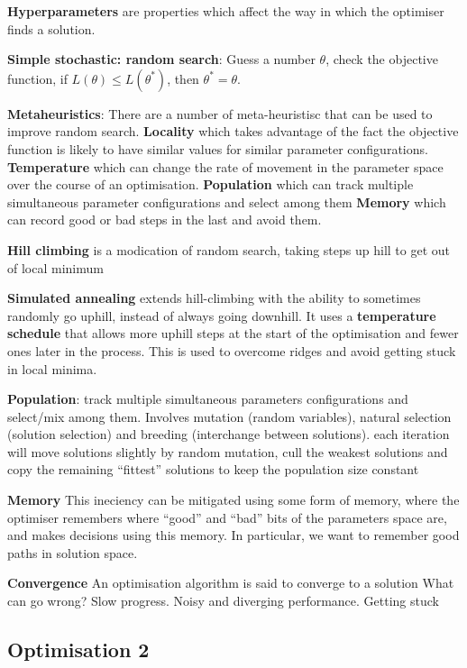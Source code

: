 \documentclass{article}
\begin{document}
\noindent \textbf{Hyperparameters} are properties which affect the way in which the optimiser finds a solution.

\noindent \textbf{Simple stochastic: random search}: Guess a number $\theta$, check the objective function,
if $L(\theta) \le L(\theta^*)$, then $\theta^* = \theta$.

\noindent \textbf{Metaheuristics}:
There are a number of meta-heuristisc that can be used to improve random search.
\textbf{Locality} which takes advantage of the fact the objective function is likely to have similar values for similar parameter configurations.
\textbf{Temperature} which can change the rate of movement in the parameter space over the course of an optimisation.
\textbf{Population} which can track multiple simultaneous parameter configurations and select among them
\textbf{Memory} which can record good or bad steps in the last and avoid them.

\noindent \textbf{Hill climbing} is a modication of random search, taking steps up hill to get out of local minimum

\noindent \textbf{Simulated annealing} extends hill-climbing with the ability to sometimes randomly go
uphill, instead of always going downhill. It uses a \textbf{temperature schedule} that allows more
uphill steps at the start of the optimisation and fewer ones later in the process. This is used
to overcome ridges and avoid getting stuck in local minima.

\noindent \textbf{Population}: track multiple simultaneous parameters configurations and select/mix among them.
Involves mutation (random variables), natural selection (solution selection) and breeding (interchange between solutions).
each iteration will move solutions slightly by random mutation, cull the weakest solutions and copy the remaining “fittest” solutions to keep the population size constant

\noindent \textbf{Memory} This ineciency can be mitigated
using some form of memory, where the optimiser remembers where “good” and “bad” bits
of the parameters space are, and makes decisions using this memory. In particular, we want
to remember good paths in solution space.

\noindent \textbf{Convergence}
An optimisation algorithm is said to converge to a solution
What can go wrong? Slow progress. Noisy and diverging performance. Getting stuck



\subsection*{Optimisation 2}
\end{document}
